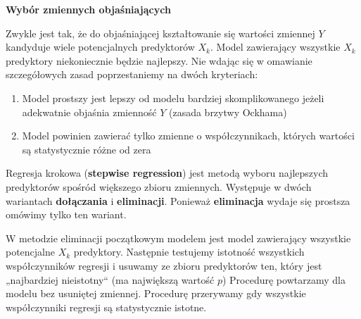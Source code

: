 \documentclass[
  openany]{book}
\begin{document}
\textbf{Wybór zmiennych objaśniających}

Zwykle jest tak, że do objaśniającej kształtowanie się wartości zmiennej \(Y\) kandyduje wiele potencjalnych
predyktorów \(X_k\).
Model zawierający wszystkie \(X_k\) predyktory niekoniecznie będzie najlepszy.
Nie wdając się w omawianie szczegółowych zasad poprzestaniemy na dwóch kryteriach:

\begin{enumerate}
\def\labelenumi{\arabic{enumi}.}
\item
  Model prostszy jest lepszy od modelu bardziej skomplikowanego jeżeli adekwatnie objaśnia zmienność \(Y\)
  (zasada brzytwy Ockhama)
\item
  Model powinien zawierać tylko zmienne o współczynnikach, których wartości są statystycznie różne od zera
\end{enumerate}

Regresja krokowa (\textbf{stepwise regression}) jest metodą wyboru najlepszych predyktorów
spośród większego zbioru zmiennych. Występuje w dwóch wariantach \textbf{dołączania} i \textbf{eliminacji}.
Ponieważ \textbf{eliminacja} wydaje się prostsza omówimy tylko ten wariant.

W metodzie eliminacji początkowym modelem jest model zawierający wszystkie potencjalne \(X_k\) predyktory.
Następnie testujemy istotność wszystkich współczynników regresji i usuwamy
ze zbioru predyktorów ten, który jest „najbardziej nieistotny`` (ma największą wartość \(p\))
Procedurę powtarzamy dla modelu bez usuniętej zmiennej.
Procedurę przerywamy gdy wszystkie współczynniki regresji są statystycznie istotne.
\end{document}
